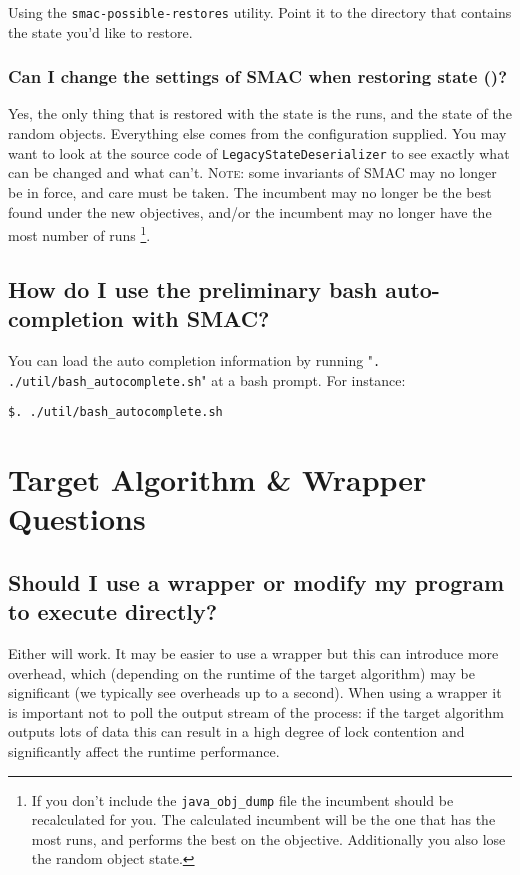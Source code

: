 \documentclass[11pt,letterpaper,oneside]{article}
\begin{document}
	Using the \texttt{smac-possible-restores} utility. Point it to the directory that contains the state you'd like to restore.

\subsubsection{Can I change the settings of SMAC when restoring state ()?}

	Yes, the only thing that is restored with the state is the runs, and the state of the random objects. Everything else comes from the configuration supplied. You may want to look at the source code of \texttt{LegacyStateDeserializer} to see exactly what can be changed and what can't. \textsc{Note:} some invariants of SMAC may no longer be in force, and care must be taken. The incumbent may no longer be the best found under the new objectives, and/or the incumbent may no longer have the most number of runs \footnote{If you don't include the \texttt{java\_obj\_dump} file the incumbent should be recalculated for you. The calculated incumbent will be the one that has the most runs, and performs the best on the objective. Additionally you also lose the random object state.}. 
	

\subsection{How do I use the preliminary bash auto-completion with SMAC?}

	You can load the auto completion information by running "\texttt{. ./util/bash\_autocomplete.sh}" at a bash prompt. For instance:
\begin{verbatim}
$. ./util/bash_autocomplete.sh
\end{verbatim}


\section{Target Algorithm \& Wrapper Questions}

\subsection{Should I use a wrapper or modify my program to execute directly?} 

	Either will work. It may be easier to use a wrapper but this can introduce more overhead, which (depending on the runtime of the target algorithm) may be significant (we typically see overheads up to a second). When using a wrapper it is important not to poll the output stream of the process: if the target algorithm outputs lots of data this can result in a high degree of lock contention and significantly affect the runtime performance.
	
\end{document}
